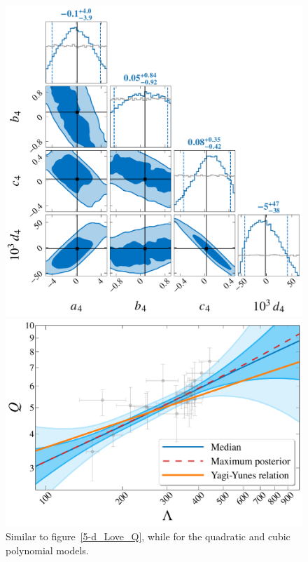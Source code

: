 \documentclass[a4paper,11pt]{article}
\begin{document}
\begin{figure}[t]
    \begin{minipage}[t]{0.49\textwidth}
    \centering
        \includegraphics[width=0.8\linewidth]{fig_hyper_parameter_4d.pdf}
    \end{minipage}
    \hfill
    \begin{minipage}[t]{0.49\textwidth}
        \includegraphics[width=\linewidth]{fig_hierarchical_results_4d.pdf}
    \end{minipage}
    \caption{Similar to figure~\ref{5-d_Love_Q}, while for the quadratic and
    cubic polynomial models. 
    }\label{3-d_4-d_Love_Q}
\end{figure}
\end{document}
